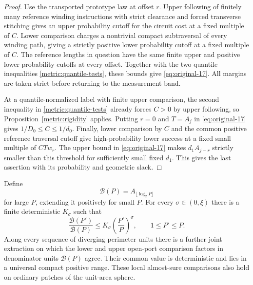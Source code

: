 \begin{proof}
Use the transported prototype law at offset $r$. Upper following of
finitely many reference winding instructions with strict clearance and
forced transverse stitching gives an upper probability cutoff for the
circuit cost at a fixed multiple of $C$. Lower comparison charges a
nontrivial compact subtraversal of every winding path, giving a strictly
positive lower probability cutoff at a fixed multiple of $C$. The
reference lengths in question have the same finite upper and positive
lower probability cutoffs at every offset. Together with the two
quantile inequalities \eqref{metric:quantile-tests}, these bounds give
\eqref{eq:original-17}. All margins are taken strict before returning
to the measurement band.

At a quantile-normalized label with finite upper comparison, the second
inequality in \eqref{metric:quantile-tests} already forces $C>0$ by
upper following, so Proposition~\ref{metric:rigidity} applies.
Putting $r=0$ and $T=A_j$ in \eqref{eq:original-17} gives
$1/D_0\le C\le1/d_0$. Finally, lower comparison by $C$ and the common
positive reference traversal cutoff give high-probability lower
success at a fixed small multiple of $CTw_r$. The upper bound in
\eqref{eq:original-17} makes $d_1A_{j-r}$ strictly smaller than this
threshold for sufficiently small fixed $d_1$. This gives the last
assertion with its probability and geometric slack.
\end{proof}

\begin{proposition}\label{metric:scale-bootstrap}
Define
\[
 \mathcal B(P)=A_{\lfloor\log_2P\rfloor}
\]
for large $P$, extending it positively for small $P$. For every
$\sigma\in(0,\xi)$ there is a finite deterministic $K_\sigma$ such that
\begin{equation}\label{eq:original-18}
 \frac{\mathcal B(P')}{\mathcal B(P)}
 \le K_\sigma\left(\frac{P'}P\right)^\sigma,
 \qquad 1\le P'\le P.
\end{equation}
Along every sequence of diverging perimeter units there is a further
joint extraction on which the lower and upper open-port comparison
factors in denominator units $\mathcal B(P)$ agree. Their common value
is deterministic and lies in a universal compact positive range.
These local almost-sure comparisons also hold on ordinary patches of
the unit-area sphere.
\end{proposition}

